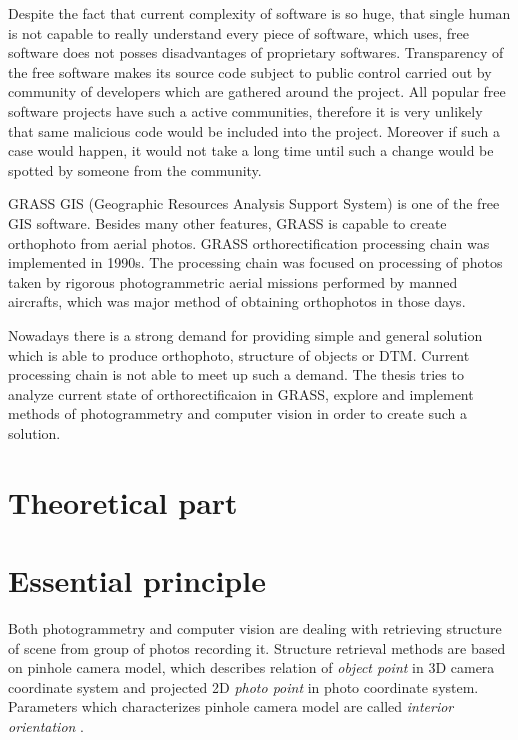 \documentclass[a4paper,12pt]{article}
\newcommand{\term}[1]{
{\it #1}
}
\begin{document}

Despite the fact that current complexity of software is so huge,
that single human is not capable to really understand every piece of software, which uses,
free software does not posses disadvantages of proprietary softwares.
Transparency of the free software makes its source code subject to public control 
carried out by community of developers which are gathered around the project.
All popular free software projects have such a active communities, therefore it is
very unlikely that same malicious code would be included into the project.
Moreover if such a case would happen, it would not take a long time until such a change 
would be spotted by someone from the community.

GRASS GIS  (Geographic Resources Analysis Support System) is one of the free GIS software. 
Besides many other features, GRASS is capable to create orthophoto from aerial photos.
GRASS orthorectification processing chain was implemented in 1990s.
The processing chain was focused on  processing of photos taken by rigorous 
photogrammetric aerial missions performed by manned aircrafts, which was 
major method of obtaining orthophotos in those days. 

Nowadays there is a strong demand for  providing simple and general solution 
which is able to produce orthophoto, structure of objects or 
DTM. Current processing chain is not able to meet up such a demand.
 The thesis tries to analyze current state of orthorectificaion in GRASS,
explore and implement methods of photogrammetry and computer vision in order 
to create such a solution. 

\section{Theoretical part}


\section{Essential principle}
\label{sec:ess_princip}

Both photogrammetry and computer vision are dealing with retrieving structure of scene from group of photos 
 recording it. Structure retrieval methods are based on pinhole camera model, which 
describes relation of \term{object point} in 
3D camera coordinate system and projected 2D \term{photo point} in photo coordinate system.
Parameters which characterizes pinhole camera model are called \term{interior orientation}.
\end{document}
